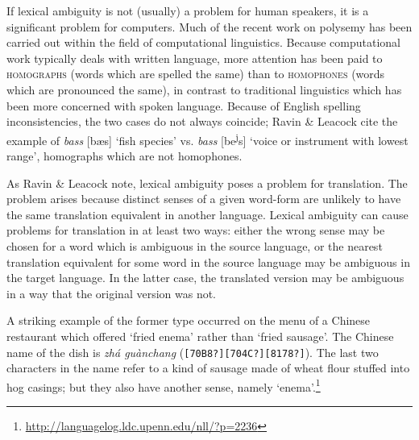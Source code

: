 If lexical ambiguity is not (usually) a problem for human speakers, it is a significant problem for computers. Much of the recent work on polysemy has been carried out within the field of computational linguistics. Because computational work typically deals with written language, more attention has been paid to \textsc{homographs} (words which are spelled the same) than to \textsc{homophones} (words which are pronounced the same), in contrast to traditional linguistics which has been more concerned with spoken language. Because of English spelling inconsistencies, the two cases do not always coincide; Ravin \& Leacock cite the example of \textit{bass} [bæs] ‘fish species’ vs. \textit{bass} [be\textsuperscript{j}s] ‘voice or instrument with lowest range’, homographs which are not homophones.



As Ravin \& Leacock note, lexical ambiguity poses a problem for translation. The problem arises because distinct senses of a given word-form are unlikely to have the same translation equivalent in another language. Lexical ambiguity can cause problems for translation in at least two ways: either the wrong sense may be chosen for a word which is ambiguous in the source language, or the nearest translation equivalent for some word in the source language may be ambiguous in the target language. In the latter case, the translated version may be ambiguous in a way that the original version was not.



A striking example of the former type occurred on the menu of a Chinese restaurant which offered ‘fried enema’ rather than ‘fried sausage’. The Chinese name of the dish is \textit{zhá guànchang} (\texttt{[70B8?][704C?][8178?]}). The last two characters in the name refer to a kind of sausage made of wheat flour stuffed into hog casings; but they also have another sense, namely ‘enema’.\footnote{\url{http://languagelog.ldc.upenn.edu/nll/?p=2236}} 



